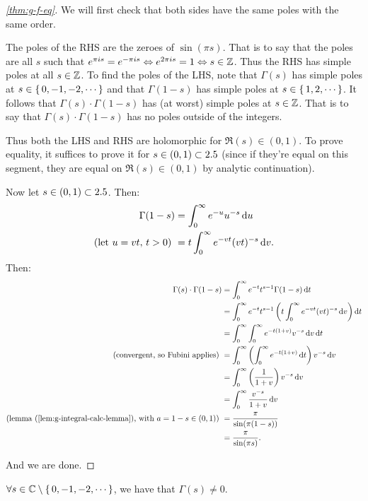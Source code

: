 \begin{proof}[\ref{thm:g-f-eq}]
We will first check that both sides have the same poles with the same order.

The poles of the RHS are the zeroes of $\sin(\pi s)$. That is to say that the poles are all $s$ such that $e^{\pi i s} = e^{- \pi i s} \Leftrightarrow e^{2 \pi i s} = 1 \Leftrightarrow s \in \mathbb{Z}$. Thus the RHS has simple poles at all $s \in \mathbb{Z}$. To find the poles of the LHS, note that $\Gamma(s)$ has simple poles at $s \in \set{0,-1,-2,\cdots}$ and that $\Gamma(1-s)$ has simple poles at $s \in \set{1,2, \cdots}$. It follows that $\Gamma(s)\cdot \Gamma(1-s)$ has (at worst) simple poles at $s \in \mathbb{Z}$. That is to say that $\Gamma(s)\cdot \Gamma(1-s)$ has no poles outside of the integers.

Thus both the LHS and RHS are holomorphic for $\Re(s) \in (0,1)$. To prove equality, it suffices to prove it for $ s \in (0,1) \subset 2.5$ (since if they're equal on this segment, they are equal on $\Re(s) \in (0,1)$ by analytic continuation).

Now let $s \in (0,1) \subset 2.5$. Then:
\begin{align*}
    \Gamma(1-s) &= \int_0^\infty e^{-u}u^{-s} \dif u\\
    \text{(let $u = vt, \, t>0$) }&= t \int_0^\infty e^{-vt} (vt)^{-s} \dif v.
\end{align*}
Then:
\begin{align*}
    \Gamma(s) \cdot \Gamma(1-s) &= \int_0^\infty e^{-t} t^{s-1} \Gamma(1-s) \dif t\\
    &= \int_0^\infty e^{-t} t^{s-1} \br{t \int_0^\infty e^{-vt} (vt)^{-s} \dif v} \dif t\\
    &= \int_0^\infty \int_0^\infty e^{-t(1+v)} v^{-s} \dif v \dif t\\
    \text{(convergent, so Fubini applies) } &= \int_0^\infty \br{\int_0^\infty e^{-t(1+v)}  \dif t } v^{-s} \dif v\\
    &= \int_0^\infty \br{\frac{1}{1+v}} v^{-s} \dif v\\ 
    &= \int_0^\infty \frac{v^{-s}}{1+v}  \dif v\\
    \text{(lemma (\ref{lem:g-integral-calc-lemma}), with $ a = 1-s \in (0,1)$) }&= \frac{\pi}{\sin(\pi (1-s))}\\
    &= \frac{\pi}{\sin(\pi s)}.
\end{align*}

And we are done.
\end{proof}

\begin{corollary}
$\forall s \in \mathbb{C} \setminus \set{0,-1,-2,\cdots}$, we have that $\Gamma(s) \neq 0$.
\end{corollary}

